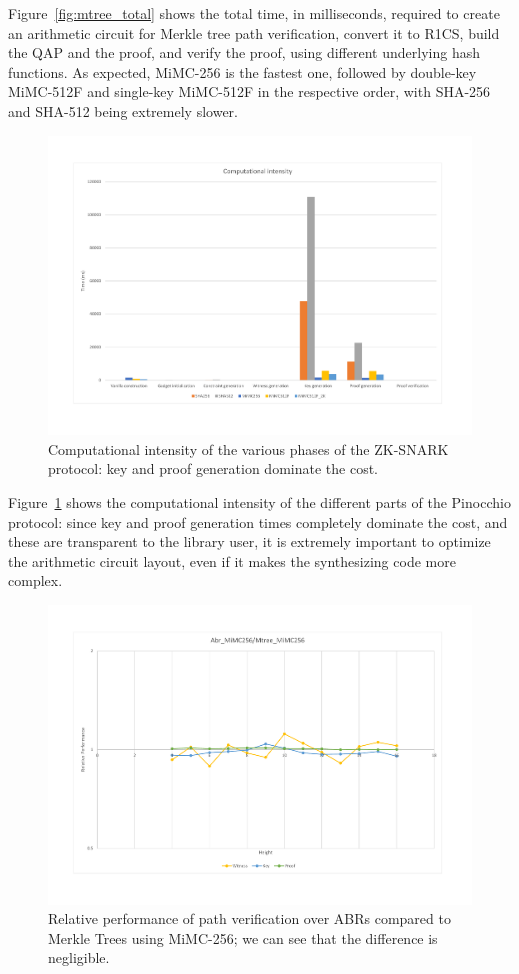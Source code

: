 Figure~\ref{fig:mtree_total} shows the total time, in milliseconds, required to create an
arithmetic circuit for Merkle tree path verification, convert it to R1CS, build the QAP and the
proof, and verify the proof, using different underlying hash functions.
As expected, MiMC-256 is the fastest one, followed by double-key MiMC-512F and single-key MiMC-512F
in the respective order, with SHA-256 and SHA-512 being extremely slower.
\begin{figure}
	\centering
	\includegraphics[scale=0.33]{res/mtree_intensity.pdf}
	\caption{Computational intensity of the various phases of the ZK-SNARK protocol: key and proof
		generation dominate the cost.}\label{fig:mtree_intensity}
\end{figure}

Figure~\ref{fig:mtree_intensity} shows the computational intensity of the different parts of the
Pinocchio protocol: since key and proof generation times completely dominate the cost, and these
are transparent to the library user, it is extremely important to optimize the arithmetic circuit
layout, even if it makes the synthesizing code more complex.
\begin{figure}
	\centering
	\includegraphics[scale=0.33]{res/mtree_vs_abr.pdf}
	\caption{Relative performance of path verification over ABRs compared to Merkle Trees using
		MiMC-256; we can see that the difference is negligible.}\label{fig:mtree_vs_abr}
\end{figure}

